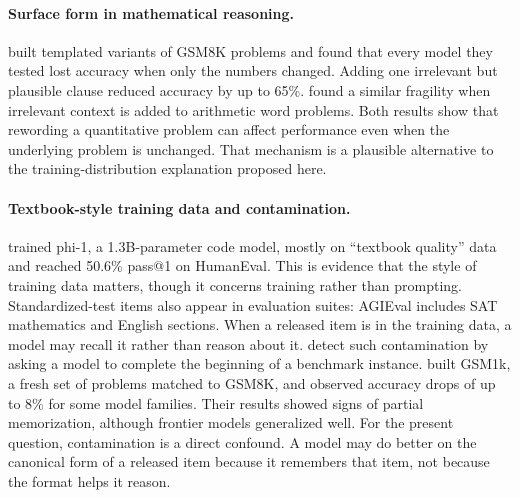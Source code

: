 \documentclass[11pt]{article}
\begin{document}
\paragraph{Surface form in mathematical reasoning.}
\citet{mirzadeh2024gsmsymbolic} built templated variants of GSM8K problems and found that every model they tested lost accuracy when only the numbers changed. Adding one irrelevant but plausible clause reduced accuracy by up to 65\%. \citet{shi2023distracted} found a similar fragility when irrelevant context is added to arithmetic word problems. Both results show that rewording a quantitative problem can affect performance even when the underlying problem is unchanged. That mechanism is a plausible alternative to the training-distribution explanation proposed here.

\paragraph{Textbook-style training data and contamination.}
\citet{gunasekar2023textbooks} trained phi-1, a 1.3B-parameter code model, mostly on ``textbook quality'' data and reached 50.6\% pass@1 on HumanEval. This is evidence that the style of training data matters, though it concerns training rather than prompting. Standardized-test items also appear in evaluation suites: AGIEval \citep{zhong2023agieval} includes SAT mathematics and English sections. When a released item is in the training data, a model may recall it rather than reason about it. \citet{golchin2024timetravel} detect such contamination by asking a model to complete the beginning of a benchmark instance. \citet{zhang2024gsm1k} built GSM1k, a fresh set of problems matched to GSM8K, and observed accuracy drops of up to 8\% for some model families. Their results showed signs of partial memorization, although frontier models generalized well. For the present question, contamination is a direct confound. A model may do better on the canonical form of a released item because it remembers that item, not because the format helps it reason.
\end{document}
